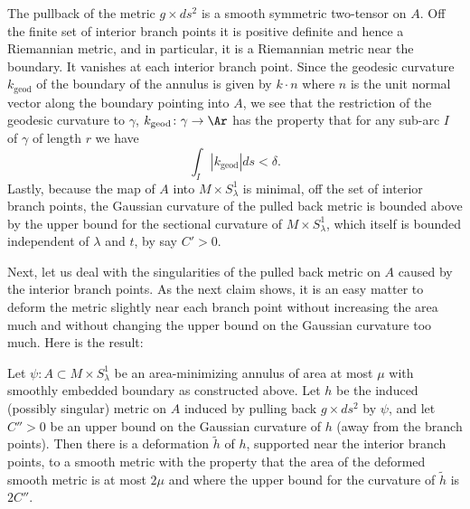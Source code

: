 The pullback of the metric $g\times ds^2$ is a smooth symmetric
two-tensor on $A$. Off the finite set of interior branch points it
is positive definite and hence a Riemannian metric, and in
particular, it is a Riemannian metric near the boundary. It vanishes
at each interior branch point.
  Since the geodesic
curvature $k_\mathrm{geod}$ of the boundary of the annulus is given by $k\cdot n$
where $n$ is the unit normal vector along the boundary pointing into $A$, we
see that the restriction of the geodesic curvature to $\gamma$, $k_\mathrm{geod}\colon \gamma\to \Ar$ has the property that for any sub-arc $I$ of
$\gamma$ of length $r$ we have
$$\int_I|k_\mathrm{geod}|ds<\delta.$$ Lastly, because the map of $A$ into $M\times
S^1_\lambda$ is minimal, off  the set of interior branch points, the
Gaussian curvature of the pulled back metric is bounded above by the
upper bound for the sectional curvature of $M\times S^1_\lambda$,
which itself is bounded independent of $\lambda$ and $t$, by say
$C'>0$.


Next, let us deal with the singularities of the pulled back metric on $A$
caused by the interior branch points. As the next claim shows, it is an easy
matter to deform the metric slightly near each branch point without increasing
the area much and without changing the upper bound on the Gaussian curvature
too much. Here is the result:

\begin{claim}
\label{claim:branch-point-metric-deformation}
Let $\psi\colon A\subset M\times S^1_\lambda$ be an area-minimizing
annulus of area at most $\mu$ with smoothly embedded boundary as
constructed above. Let $h$ be the induced (possibly singular) metric
on $A$ induced by pulling back $g\times ds^2$ by $\psi$, and let
$C''>0$ be an upper bound on the Gaussian curvature of $h$ (away
from the branch points). Then  there is a deformation $\tilde h$ of
$h$, supported near the interior branch points, to a smooth metric
with the property that the area of the deformed smooth metric is at
most $2\mu$ and where the upper bound for the curvature of $\tilde
h$ is $2C''$.
\end{claim}


